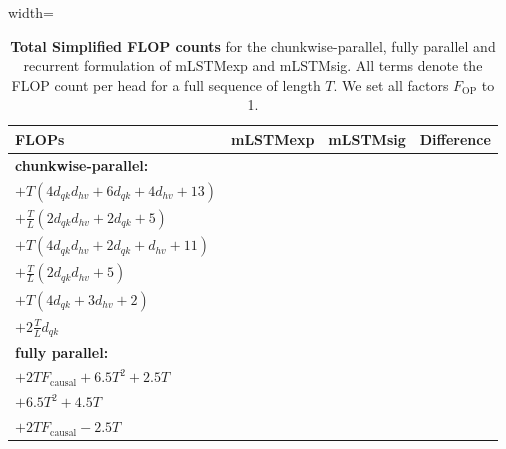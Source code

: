 \documentclass{article}
\begin{document}
    \begin{table}[htbp]
        \vspace{-0.3cm}
        \centering
        \caption{\label{tab:simpl_total_flop_counts_mlstm} \textbf{Total Simplified FLOP counts} for the chunkwise-parallel, fully parallel and recurrent formulation of mLSTMexp and mLSTMsig.
            All terms denote the FLOP count per head for a full sequence of length $T$. We set all factors $F_\text{OP}$ to 1.}
        \vspace{0.2cm}
        \begin{adjustbox}{width=\textwidth}
            \begin{tabular}{lcc|c}
                \toprule
                FLOPs                        & mLSTMexp                                                                                    & mLSTMsig                                      & Difference                              \\
                \midrule
                \textbf{chunkwise-parallel:} & \thead{$T L F_\text{causal} \left( 2 (d_{qk} + d_{hv}) + 8\right) + TL + 2TF_\text{causal}$                                                                                           \\ $+ T\left(4 d_{qk} d_{hv} + 6 d_{qk} + 4 d_{hv} + 13\right)$ \\ $+\frac{T}{L} \left( 2 d_{qk} d_{hv}  + 2 d_{qk} + 5\right)$}   &   \thead{$T L F_\text{causal} \left( 2 (d_{qk} + d_{hv}) + 6\right) + TL$ \\ $+ T\left(4 d_{qk} d_{hv} + 2 d_{qk} + d_{hv} + 11\right)$ \\ $+\frac{T}{L} \left( 2 d_{qk} d_{hv} + 5\right)$} & \thead{$2 T L F_\text{causal} + 2TF_\text{causal}$\\$+ T\left(4 d_{qk} + 3 d_{hv} + 2\right)$ \\ $+2 \frac{T}{L}  d_{qk}$}  \\
                \midrule
                \textbf{fully parallel:}     & \thead{$T^2 F_\text{causal} \left( 2(d_{qk} + d_{hv}) + 6\right)$                                                                                                                     \\ $+ 2TF_\text{causal} + 6.5T^2 + 2.5T$}                                          & \thead{$T^2 F_\text{causal} \left( 2(d_{qk} + d_{hv}) + 2\right)$                                                                           \\ $+ 6.5T^2 + 4.5T$}    &   \thead{$4 T^2 F_\text{causal} $                                                                                        \\ $+ 2TF_\text{causal} - 2.5T$}        \\

\end{tabular}
\end{adjustbox}
\end{table}
\end{document}

